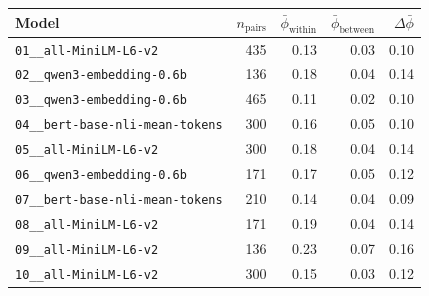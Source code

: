 \begin{tabular}{lrrrr}
\toprule
Model & $n_{\mathrm{pairs}}$ & $\bar{\phi}_{\mathrm{within}}$ & $\bar{\phi}_{\mathrm{between}}$ & $\Delta\bar{\phi}$ \\
\midrule
\texttt{01\_\_all-MiniLM-L6-v2} & 435 & 0.13 & 0.03 & 0.10 \\
\texttt{02\_\_qwen3-embedding-0.6b} & 136 & 0.18 & 0.04 & 0.14 \\
\texttt{03\_\_qwen3-embedding-0.6b} & 465 & 0.11 & 0.02 & 0.10 \\
\texttt{04\_\_bert-base-nli-mean-tokens} & 300 & 0.16 & 0.05 & 0.10 \\
\texttt{05\_\_all-MiniLM-L6-v2} & 300 & 0.18 & 0.04 & 0.14 \\
\texttt{06\_\_qwen3-embedding-0.6b} & 171 & 0.17 & 0.05 & 0.12 \\
\texttt{07\_\_bert-base-nli-mean-tokens} & 210 & 0.14 & 0.04 & 0.09 \\
\texttt{08\_\_all-MiniLM-L6-v2} & 171 & 0.19 & 0.04 & 0.14 \\
\texttt{09\_\_all-MiniLM-L6-v2} & 136 & 0.23 & 0.07 & 0.16 \\
\texttt{10\_\_all-MiniLM-L6-v2} & 300 & 0.15 & 0.03 & 0.12 \\
\bottomrule
\end{tabular}
